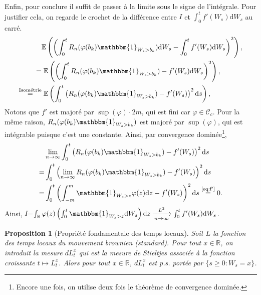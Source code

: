 \documentclass[openany]{book}
\makeatletter
\newcommand{\R}{\mathbb{R}}
\newcommand{\E}{\mathbb{E}}
\newcommand{\1}{\mathbbm{1}}
\renewcommand{\d}{\mathrm{d}}
\renewenvironment{proof}[1][\textbf{\textit{Démonstration}}]{%
  \par\pushQED{\qed}%
  \normalfont\topsep6\p@\@plus6\p@\relax
  \trivlist\item[\hskip\labelsep
    #1\@addpunct{.}]\ignorespaces
}{%
  \popQED\endtrivlist\@endpefalse
}
\theoremstyle{thmfont}
\theoremstyle{deffont}
\theoremstyle{thmfont}
\newtheorem{prop}[prop]{Proposition}
\theoremstyle{deffont}
\makeatother
\begin{document}
\begin{proof}
  Enfin, pour conclure il suffit de passer à la limite sous le signe de l'intégrale. Pour justifier cela, on regarde le crochet de la différence entre \hyperlink{termI}{$I$} et $\int_0^t f'(W_s) \d W_s$ au carré.
  \begin{align*}
    & \E\left(\left( \int_0^t R_n(\varphi(b_k) \1_{W_s>b_k}) \d W_s - \int_0^t f'(W_s) \d W_s\right)^2\right),\\
    =&  \;\E\left(\left( \int_0^t R_n(\varphi(b_k) \1_{W_s>b_k}) - f'(W_s) \d W_s\right)^2\right),\\
    \overset{\text{Isométrie}}{=}& \;\E\left( \int_0^t \left(R_n(\varphi(b_k) \1_{W_s>b_k}) - f'(W_s) \right)^2\d s\right),
  \end{align*}
  Notons que $f'$ est majoré par $\sup(\varphi)\cdot 2m$, qui est fini car $\varphi \in \mathcal C_c$. Pour la même raison, $R_n(\varphi(b_k) \1_{W_s>b_k})$ est majoré par $\sup(\varphi)$, qui est intégrable puisque c'est une constante. Ainsi, par convergence dominée\footnote{Encore une fois, on utilise deux fois le théorème de convergence dominée.},
  \begin{align*}
     & \lim_{n \to \infty}\int_0^t \left(R_n(\varphi(b_k) \1_{W_s>b_k}) - f'(W_s) \right)^2\d s\\
    =&  \int_0^t \left(\lim_{n \to \infty}R_n(\varphi(b_k) \1_{W_s>b_k}) - f'(W_s) \right)^2\d s\\
    =&  \int_0^t  \left( \int_{-m}^m \1_{W_s > z}  \varphi(z)\d z - f'(W_s) \right)^2\d s \overset{\text{\eqref{eq:f'}}}{=} 0.
  \end{align*}
  Ainsi, \hyperlink{termI}{$I$}=$\int_\R \varphi(z)\left( \int_0^t \1_{W_s>z} \d W_s \right) \d z\xrightarrow[n \to \infty]{L^2} \int_0^t f'(W_s) \d W_s$.
\end{proof}

\begin{prop}[Propriété fondamentale des temps locaux]
Soit $L$ la fonction des temps locaux du mouvement brownien (standard). Pour tout $x \in \R$, on introduit la mesure $dL^x_t$ qui est la mesure de Stieltjes associée à la fonction croissante $t \mapsto L_t^x$. Alors pour tout $x\in \R$, $dL^x_t$ est p.s. portée par $\{s \geq 0 : W_s = x\}$.
\end{prop}
\end{document}
